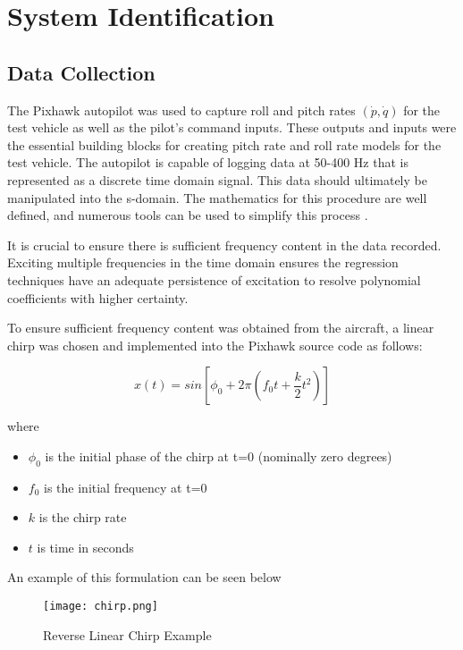 \label{appendix:system_identification}
\section{System Identification}

\subsection{Data Collection}
The Pixhawk autopilot was used to capture roll and pitch rates $(\dot{p},\dot{q})$ for the test vehicle as well as the pilot's command inputs.  These outputs and inputs were the essential building blocks for creating pitch rate and roll rate models for the test vehicle.  The autopilot is capable of logging data at 50-400 Hz that is represented as a discrete time domain signal.  This data should ultimately be manipulated into the s-domain.  The mathematics for this procedure are well defined, and numerous tools can be used to simplify this process \cite{tfest_matlab}.  

It is crucial to ensure there is sufficient frequency content in the data recorded.  Exciting multiple frequencies in the time domain ensures the regression techniques have an adequate persistence of excitation to resolve polynomial coefficients with higher certainty.  

To ensure sufficient frequency content was obtained from the aircraft, a linear chirp was chosen and implemented into the Pixhawk source code as follows:

\begin{equation}
x(t)=sin\left[\phi_0+2\pi\left(f_0t+\frac{k}{2}t^2\right)\right]
\end{equation}

where
\begin{itemize}
 \item[] $\phi_0$ is the initial phase of the chirp at t=0 (nominally zero degrees)
 \item[] $f_0$ is the initial frequency at t=0
 \item[] $k$ is the chirp rate
 \item[] $t$  is time in seconds
\end{itemize}

An example of this formulation can be seen below

\begin{figure}[!h]
 \centering
  \texttt{[image: chirp.png]}
  \caption{Reverse Linear Chirp Example}
  \label{fig:chirp}
\end{figure}

